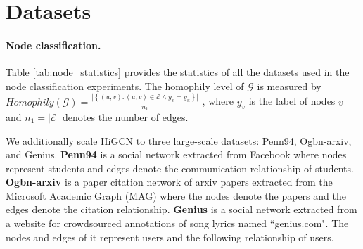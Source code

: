 \documentclass[letterpaper]{article} \usepackage{aaai24}
\theoremstyle{plain}
\theoremstyle{definition}
\theoremstyle{remark}
\begin{document}
\section{Datasets}
\label{appendix: datasets}

\paragraph{Node classification.}
Table \ref{tab:node_statistics} provides the statistics of all the datasets used in the node classification experiments.
The homophily level of $\mathcal{G}$ is measured by $Homophily(\mathcal{G})=\frac{\left|\left\{(u, v):(u, v) \in \mathcal{E} \wedge y_v=y_u\right\}\right|}{n_1}$ \cite{homo2020}, where $y_v$ is the label of nodes $v$ and $n_1 = |\mathcal{E}|$ denotes the number of edges.

We additionally scale HiGCN to three large-scale datasets: Penn94, Ogbn-arxiv, and Genius.
\textbf{Penn94} \cite{data:penn94} is a social network extracted from Facebook where nodes represent students and edges denote the communication relationship of students.
\textbf{Ogbn-arxiv} \cite{data:ogbn_arxiv} is a paper citation network of arxiv papers extracted from the Microsoft Academic Graph (MAG) where the nodes denote the papers and the edges denote the citation relationship.
\textbf{Genius} \cite{data:genius} is a social network extracted from a website for crowdsourced annotations of song lyrics named ``genius.com".
The nodes and edges of it represent users and the following relationship of users.
\end{document}
